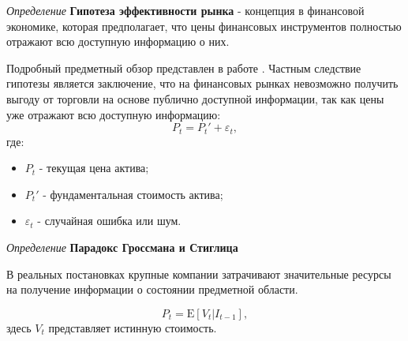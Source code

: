 \textit{Определение} \textbf{Гипотеза эффективности рынка} -  концепция в финансовой экономике,
 которая предполагает, что цены финансовых инструментов полностью отражают всю доступную информацию о них. 

Подробный предметный обзор представлен в работе \cite{архипов2007предпосылки}. 
Частным следствие гипотезы является заключение, что на финансовых рынках невозможно получить выгоду от торговли на основе публично доступной информации, 
так как цены уже отражают всю доступную информацию:
\begin{equation}
     P_t = P_t' + \varepsilon_t,
\end{equation}
где:
 \begin{itemize}
    \item \( P_t \) - текущая цена актива;
    \item \( P_t' \) - фундаментальная стоимость актива;
    \item \( \varepsilon_t \) - случайная ошибка или шум.
\end{itemize}



\textit{Определение} \textbf{Парадокс Гроссмана и Стиглица} \cite{grossman1980impossibility}



В реальных постановках крупные компании затрачивают значительные ресурсы на получение информации о состоянии предметной области.

\begin{equation}
    P_t = \mathrm{E}[V_t|I_{t-1}],
\end{equation}
здесь $V_t$ представляет истинную стоимость.


